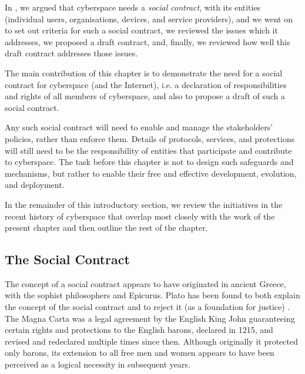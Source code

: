 \iffalse
As the Internet and its residents, human and otherwise, grow in
expressiveness, creativity, and energy, it seems inevitable that
there will also emerge a growing need for, and development of, {\em
regulation}. To some, this may seem like a betrayal of the original ideals
of the Internet.  On the other hand, if such regulation is neglected,
as we argue it has been up to now, the regulations imposed by nation
states, corporations, and other stakeholders, might cast an unnecessary
and unwanted shadow on cyberspace.
\fi
In \cite{sheniar2021social}, we argued that cyberspace needs a {\em social contract}, with its entities (individual users, organisations, devices, and service providers), and we went on to set out criteria for such a social contract, we reviewed the issues which it addresses, we proposed a draft contract, and, finally, we reviewed how well this draft contract addresses those issues.


The main contribution of this chapter is to demonstrate the need for a social contract for cyberspace (and the Internet), i.e. a declaration of responsibilities and rights of all members of cyberspace, and also to propose a draft of such a social contract.

Any such social contract will need to enable and manage the stakeholders' policies, rather than enforce them. Details of protocols, services, and protections will still need to be the responsibility of entities that participate and contribute to cyberspace. The task before this chapter is not to design such safeguards and mechanisms, but rather to enable their free and effective development, evolution, and deployment.

In the remainder of this introductory section, we review the initiatives in the recent history of cyberspace that overlap most closely with the work of the present chapter and then outline the rest of the chapter.

\subsection{The Social Contract}

The concept of a social contract appears to have originated in ancient
Greece, with the sophist philosophers and Epicurus. Plato has been
found to both explain the concept of the social contract and to reject
it (as a foundation for justice)  \cite{Plato5} .
The Magna Carta was a legal agreement by the English King John
guaranteeing certain rights and protections to the English barons, 
declared in 1215, and revised and redeclared
multiple times since then. Although originally it protected only barons,
its extension to all free men and women appears to have been perceived
as a logical necessity in subsequent years.

